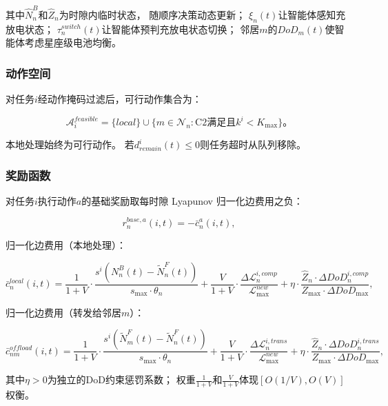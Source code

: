 \documentclass[a4paper,11pt]{article}
\begin{document}
其中$\hat{N}^B_n$和$\hat{Z}_n$为时隙内临时状态，
随顺序决策动态更新；
$\xi_n(t)$让智能体感知充放电状态；
$\tau^{switch}_n(t)$让智能体预判充放电状态切换；
邻居$m$的$DoD_m(t)$使智能体考虑星座级电池均衡。

\subsubsection{动作空间}

对任务$i$经动作掩码过滤后，可行动作集合为：

\begin{equation}
\mathcal{A}^{feasible}_i =
\{local\}
\cup \{m \in \mathcal{N}_n : \text{C2满足且}k^i < K_{\max}\}。
\label{eq:feasible_actions}
\end{equation}

本地处理始终为可行动作。
若$d^i_{remain}(t) \leq 0$则任务超时从队列移除。

\subsubsection{奖励函数}

对任务$i$执行动作$a$的基础奖励取每时隙 Lyapunov 归一化边费用之负：

\begin{equation}
r^{base,a}_n(i,t) = -\bar{c}^a_n(i,t),
\label{eq:reward}
\end{equation}

归一化边费用（本地处理）：

\begin{equation}
\bar{c}^{local}_n(i,t) =
\frac{1}{1+V}\cdot\frac{s^i(N^B_n(t) - \tilde{N}^F_n(t))}{s_{\max}\cdot\theta_n}
+ \frac{V}{1+V}\cdot\frac{\Delta\mathcal{L}^{i,comp}_n}{\mathcal{L}^{new}_{\max}}
+ \eta\cdot\frac{\hat{Z}_n\cdot\Delta DoD^{i,comp}_n}
{Z_{\max}\cdot\Delta DoD_{\max}},
\label{eq:cost_local}
\end{equation}

归一化边费用（转发给邻居$m$）：

\begin{equation}
\bar{c}^{offload}_{nm}(i,t) =
\frac{1}{1+V}\cdot\frac{s^i(\tilde{N}^F_m(t) - \tilde{N}^F_n(t))}{s_{\max}\cdot\theta_n}
+ \frac{V}{1+V}\cdot\frac{\Delta\mathcal{L}^{i,trans}_n}{\mathcal{L}^{new}_{\max}}
+ \eta\cdot\frac{\hat{Z}_n\cdot\Delta DoD^{i,trans}_n}
{Z_{\max}\cdot\Delta DoD_{\max}},
\label{eq:cost_offload}
\end{equation}

其中$\eta > 0$为独立的DoD约束惩罚系数；
权重$\frac{1}{1+V}$和$\frac{V}{1+V}$体现$[O(1/V), O(V)]$权衡。
\end{document}
